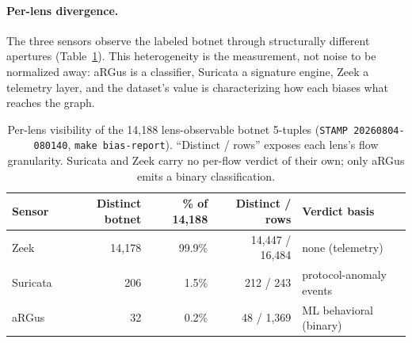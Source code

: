 \documentclass[11pt,a4paper]{article}
\begin{document}
    \paragraph{Per-lens divergence.}
    The three sensors observe the labeled botnet through structurally different apertures
    (Table~\ref{tab:perlens}). This heterogeneity is the measurement, not noise to be
    normalized away: aRGus is a classifier, Suricata a signature engine, Zeek a telemetry
    layer, and the dataset's value is characterizing how each biases what reaches the graph.

    \begin{table}[h]
        \centering
        \footnotesize
        \caption{Per-lens visibility of the 14{,}188 lens-observable botnet 5-tuples
            (\texttt{STAMP~20260804-080140}, \texttt{make bias-report}). ``Distinct / rows''
            exposes each lens's flow granularity. Suricata and Zeek carry no per-flow verdict of
            their own; only aRGus emits a binary classification.}
        \label{tab:perlens}
        \begin{tabular}{lrrrl}
            \toprule
            \textbf{Sensor} & \textbf{Distinct botnet} & \textbf{\% of 14{,}188} &
            \textbf{Distinct / rows} & \textbf{Verdict basis} \\
            \midrule
            Zeek~     & 14{,}178 & 99.9\% & 14{,}447 / 16{,}484 & none (telemetry) \\
            Suricata~ &    206   &  1.5\% &    212 / 243        & protocol-anomaly events \\
            aRGus~    &     32   &  0.2\% &     48 / 1{,}369    & ML behavioral (binary) \\
            \bottomrule
        \end{tabular}
    \end{table}
\end{document}
